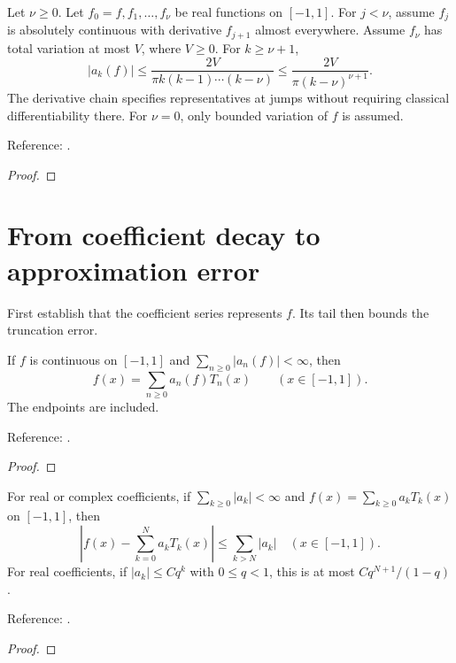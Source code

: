 \begin{theorem}
\label{thm:smooth-coefficient-decay}
\leanok
Let $\nu\ge0$. Let $f_0=f,f_1,\ldots,f_\nu$ be real functions on $[-1,1]$.
For $j<\nu$, assume $f_j$ is absolutely continuous with derivative $f_{j+1}$
almost everywhere. Assume $f_\nu$ has total variation at most $V$, where
$V\ge0$. For $k\ge\nu+1$,
\[|a_k(f)|\le \frac{2V}{\pi k(k-1)\cdots(k-\nu)}
\le\frac{2V}{\pi(k-\nu)^{\nu+1}}.\]
The derivative chain specifies representatives at jumps without requiring
classical differentiability there. For $\nu=0$, only bounded variation of $f$
is assumed.

Reference: \cite[Theorem 7.1]{atap}.
\end{theorem}
\begin{proof}
\leanok
\end{proof}

\section{From coefficient decay to approximation error}\label{sec:textbook-smoothness-error}

First establish that the coefficient series represents $f$. Its tail then bounds the truncation error.

\begin{theorem}
\label{thm:series-representation}
\leanok
If $f$ is continuous on $[-1,1]$ and $\sum_{n\ge0}|a_n(f)|<\infty$, then
\[
f(x)=\sum_{n\ge0}a_n(f)T_n(x)\qquad (x\in[-1,1]).
\]
The endpoints are included.

Reference: \cite[Chapters 4 and 7]{atap}.
\end{theorem}
\begin{proof}
\leanok
\end{proof}

\begin{theorem}
\label{thm:coefficient-tail}
\leanok
For real or complex coefficients, if $\sum_{k\ge0}|a_k|<\infty$ and $f(x)=\sum_{k\ge0}a_kT_k(x)$ on $[-1,1]$, then
\[|f(x)-\sum_{k=0}^N a_kT_k(x)|\le\sum_{k>N}|a_k|\quad(x\in[-1,1]).\]
For real coefficients, if $|a_k|\le Cq^k$ with $0\le q<1$, this is at most $Cq^{N+1}/(1-q)$.


Reference: \cite[equation 4.8 and Theorems 7.2 and 8.2]{atap}.
\end{theorem}
\begin{proof}
\leanok
\end{proof}

